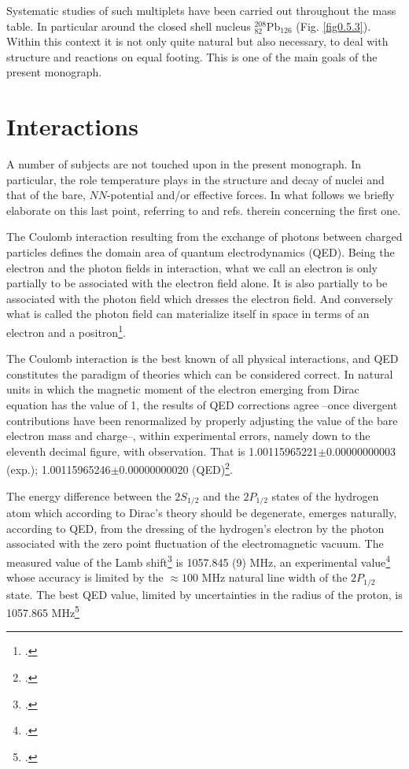 Systematic studies of such multiplets have been carried out throughout the mass table. In particular around the closed shell nucleus $^{208}_{82}$Pb$_{126}$ (Fig. \ref{fig0.5.3}). Within this context it is not only  quite natural but also necessary, to deal with structure and reactions on equal footing.  This is one of the main goals of the present monograph. 
\section{Interactions}\label{S1.9}
A number of subjects are not touched upon in the present monograph. In particular, the role temperature plays in the structure and decay of nuclei and that of the bare,  $NN$-potential and/or effective forces. In what follows we briefly elaborate on this last point, referring to \cite{Bortignon:98} and refs. therein concerning the first one.

The Coulomb interaction resulting from the exchange of photons between charged particles defines the domain area of quantum electrodynamics (QED). Being the electron and the photon fields in interaction, what we call an electron is only partially to be associated with the electron field alone. It is also partially to be associated with the photon field which dresses the electron field. And conversely what is called the photon field can materialize itself in space in terms of an electron and a positron\footnote{\cite{Schwinger:01}.}.

The Coulomb interaction is the best known of all physical interactions, and QED constitutes the paradigm of theories which can be considered correct. In natural units in which the magnetic moment of the electron emerging from Dirac equation has the value of 1, the results of QED corrections agree --once divergent contributions have been renormalized by properly adjusting the value of the bare electron mass and charge--, within experimental errors, namely down to the eleventh decimal figure, with observation. That is 1.00115965221$\pm$0.00000000003 (exp.); 1.00115965246$\pm$0.00000000020 (QED)\footnote{\cite{Kinoshita:90}.}.


 The energy difference between the $2S_{1/2}$ and the $2P_{1/2}$ states of the hydrogen atom which according to Dirac's theory should be degenerate, emerges naturally, according to QED, from the dressing of the hydrogen's electron by the photon associated with the zero point fluctuation of the electromagnetic vacuum. The measured value of the Lamb shift\footnote{\cite{Lamb:51b}.}  is 1057.845 (9) MHz, an experimental value\footnote{\cite{Lundeen:81,Lundeen:86,Pipkin:90}.} whose accuracy is limited by the $\approx 100$ MHz natural line width of the $2P_{1/2}$ state. The best QED value, limited by uncertainties in the radius of the proton, is 1057.865 MHz\footnote{\cite{Sapirstein:90,Grotch:94}.}

